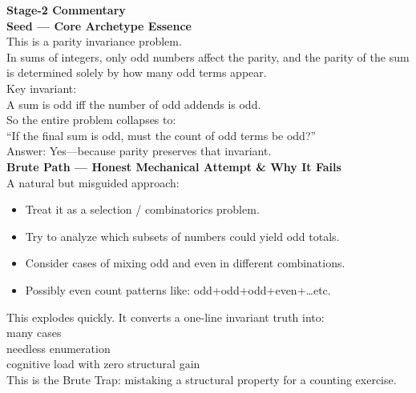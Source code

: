 \documentclass{article}
\begin{document}
\noindent \textbf{Stage-2 Commentary} \\

\noindent \textbf{Seed — Core Archetype Essence} \\
This is a parity invariance problem. \\
In sums of integers, only odd numbers affect the parity, and the parity of the sum is determined solely by how many odd terms appear. \\
Key invariant: \\
A sum is odd iff the number of odd addends is odd. \\
So the entire problem collapses to: \\
“If the final sum is odd, must the count of odd terms be odd?” \\
Answer: Yes—because parity preserves that invariant. \\

\noindent \textbf{Brute Path — Honest Mechanical Attempt \& Why It Fails} \\
A natural but misguided approach:
\begin{itemize}
    \item Treat it as a selection / combinatorics problem.
    \item Try to analyze which subsets of numbers could yield odd totals.
    \item Consider cases of mixing odd and even in different combinations.
    \item Possibly even count patterns like: odd+odd+odd+even+\dots etc.
\end{itemize}
This explodes quickly. It converts a one-line invariant truth into: \\
many cases \\
needless enumeration \\
cognitive load with zero structural gain \\
This is the Brute Trap: mistaking a structural property for a counting exercise. \\
\end{document}
